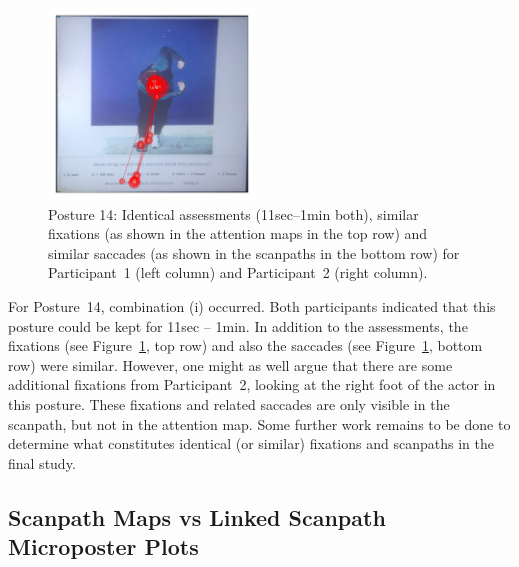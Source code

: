 \documentclass[11pt]{asaproc}
\begin{document}
\begin{figure}[t]
\begin{center}
\includegraphics[width=0.49\textwidth]{figures/Subject13_scanpath_posture14.jpg}
\end{center}
\caption{\label{Posture14View}Posture 14: Identical assessments (11sec--1min both),
similar fixations (as shown in the attention maps in the top row) and 
similar saccades (as shown in the scanpaths in the bottom row)
for Participant~1 (left column) and Participant~2 (right column).
}
\end{figure}


For Posture~14, combination (i) occurred.
Both participants indicated that this posture could be kept for
11sec -- 1min. In addition to the assessments, the
fixations (see Figure~\ref{Posture14View}, top row) and also 
the saccades (see Figure~\ref{Posture14View}, bottom row) were similar.
However, one might as well argue that there are some additional fixations
from Participant~2, looking at the right foot of the actor in this posture.
These fixations and related saccades are only visible in the scanpath,
but not in the attention map. Some further work remains to be done to determine what constitutes
identical (or similar) fixations and scanpaths in the final study.


\subsection{Scanpath Maps vs Linked Scanpath Microposter Plots}
\label{ScanpathVsMicroposter}
\end{document}

